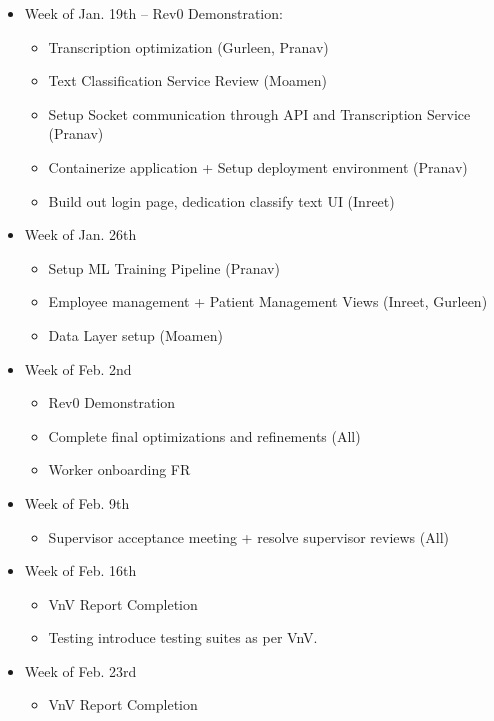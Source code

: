 \documentclass[12pt, titlepage]{article}
\begin{document}
\begin{itemize}
  \item Week of Jan. 19th -- Rev0 Demonstration:
    \begin{itemize}
      \item Transcription optimization (Gurleen, Pranav)
      \item Text Classification Service Review (Moamen)
      \item Setup Socket communication through API and Transcription Service (Pranav)
      \item Containerize application + Setup deployment environment (Pranav)
      \item Build out login page, dedication classify text UI (Inreet)
    \end{itemize}
  \item Week of Jan. 26th
    \begin{itemize}
      \item Setup ML Training Pipeline (Pranav)
      \item Employee management + Patient Management Views (Inreet, Gurleen)
      \item Data Layer setup (Moamen)
    \end{itemize}
  \item Week of Feb. 2nd
    \begin{itemize}
      \item Rev0 Demonstration
      \item Complete final optimizations and refinements (All)
      \item Worker onboarding FR
    \end{itemize}
  \item Week of Feb. 9th
    \begin{itemize}
      \item Supervisor acceptance meeting + resolve supervisor reviews (All)
    \end{itemize}
  \item Week of Feb. 16th
    \begin{itemize}
      \item VnV Report Completion
      \item Testing introduce testing suites as per VnV.
    \end{itemize}
  \item Week of Feb. 23rd
    \begin{itemize}
      \item VnV Report Completion
    \end{itemize}

\end{itemize}
\end{document}
